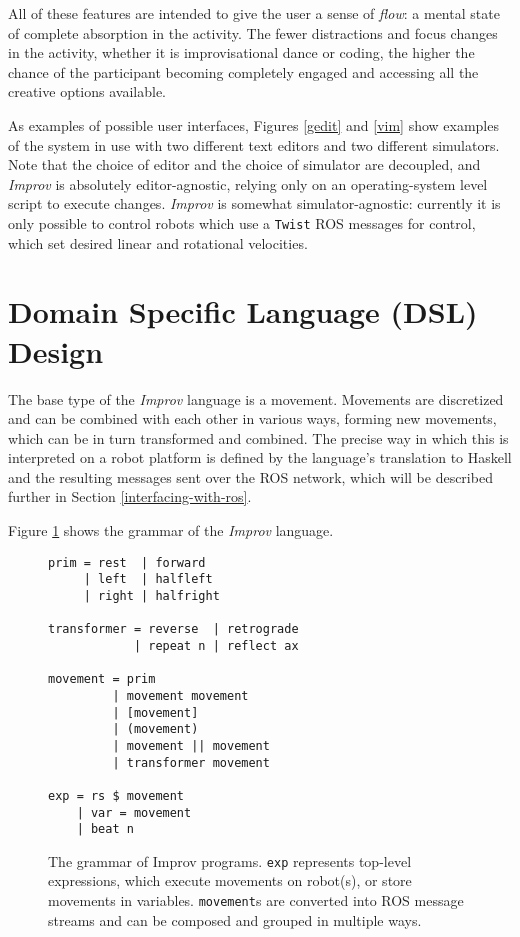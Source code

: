 \documentclass[sigconf]{acmart}
\begin{document}
All of these features are intended to give the user a sense of \emph{flow}: a
mental state of complete absorption in the activity. The fewer distractions and
focus changes in the activity, whether it is improvisational dance or coding,
the higher the chance of the participant becoming completely engaged and
accessing all the creative options available.


As examples of possible user interfaces, Figures \ref{gedit} and \ref{vim} show examples of the system in use with two
different text editors and two different simulators. Note that the choice of
editor and the choice of simulator are decoupled, and \emph{Improv} is
absolutely editor-agnostic, relying only on an operating-system level script
to execute changes. \emph{Improv} is somewhat simulator-agnostic: 
currently it is only possible to control robots which use a \texttt{Twist} ROS messages
for control, which set desired linear and rotational
velocities.



\section{Domain Specific Language (DSL)
Design}\label{domain-specific-language-design}


The base type of the \emph{Improv} language is a movement. Movements are
discretized and can be combined with each other in various ways, forming new
movements, which can be in turn transformed and combined. The precise way in
which this is interpreted on a robot platform is defined by the language's
translation to Haskell and the resulting messages sent over the ROS network,
which will be described further in Section \ref{interfacing-with-ros}.

Figure \ref{grammar} shows the grammar of the \emph{Improv} language.

\begin{figure}
\centering
\begin{verbatim}
prim = rest  | forward 
     | left  | halfleft
     | right | halfright

transformer = reverse  | retrograde 
            | repeat n | reflect ax

movement = prim
         | movement movement
         | [movement]
         | (movement)
         | movement || movement 
         | transformer movement

exp = rs $ movement
    | var = movement
    | beat n
\end{verbatim}
\caption{The grammar of Improv programs. \texttt{exp} represents top-level
expressions, which execute movements on robot(s), or store movements in
variables. \texttt{movement}s are converted into ROS message streams and can be
composed and grouped in multiple ways. \label{grammar}}

\end{figure}
\end{document}
